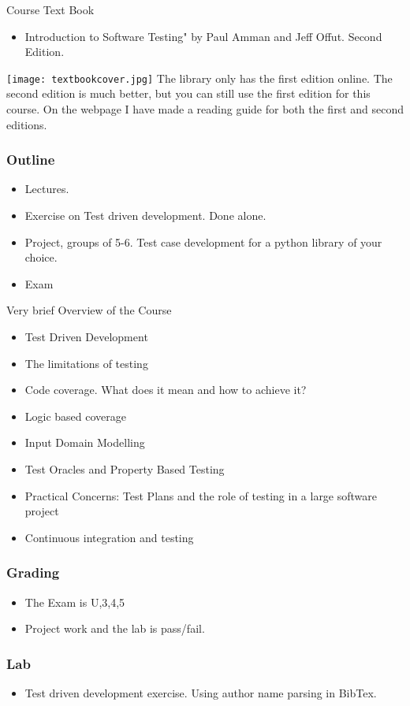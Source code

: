 \documentclass{beamer}
\begin{document}
\begin{frame}{Course Text Book}
  \begin{itemize}
  \item Introduction to Software Testing" by Paul Amman and Jeff
    Offut. Second Edition. 
  \end{itemize}
  \texttt{[image: textbookcover.jpg]} The library only has the first
  edition online. The second edition is much better, but you can still
  use the first edition for this course. On the webpage I have made a
  reading guide for both the first and second editions.
\end{frame}
\begin{frame}
  \frametitle{Outline}
  \begin{itemize}
  \item Lectures.
  \item Exercise on Test driven development. Done alone.
  \item Project, groups of 5-6. Test case development for a python
    library of your choice.
  \item Exam
  \end{itemize}
\end{frame}
\begin{frame}{Very brief Overview of the Course}
  \begin{itemize}
  \item Test Driven Development
  \item The limitations of testing
  \item Code coverage. What does it mean and how to achieve it?
  \item Logic based coverage
  \item Input Domain Modelling
  \item Test Oracles and Property Based Testing
  \item Practical Concerns: Test Plans and the role of testing in a
    large software project
  \item Continuous integration and testing 
  \end{itemize}
\end{frame}
\begin{frame}
  \frametitle{Grading}
  \begin{itemize}
  \item The Exam is U,3,4,5
  \item Project work and the lab is pass/fail.
  \end{itemize}
\end{frame}
\begin{frame}
  \frametitle{Lab}
  \begin{itemize}
  \item Test driven development exercise. Using author name parsing in
    BibTex. 
  \end{itemize}
\end{frame}
\end{document}
